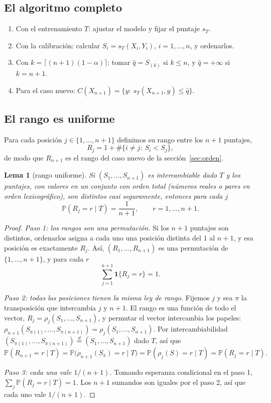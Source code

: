 \documentclass[11pt]{article}
\theoremstyle{plain}
\newtheorem{lema}[teorema]{Lema}
\theoremstyle{definition}
\theoremstyle{remark}
\newcommand{\Prob}{\mathbb P}
\newcommand{\ind}{\mathbf 1}
\newcommand{\qhat}{\widehat q}
\newcommand{\eqd}{\overset{d}{=}}
\begin{document}
\subsection{El algoritmo completo}
\begin{enumerate}
\item Con el entrenamiento $T$: ajustar el modelo y fijar el puntaje $s_T$.
\item Con la calibración: calcular $S_i=s_T(X_i,Y_i)$, $i=1,\dots,n$, y ordenarlos.
\item Con $k=\lceil(n+1)(1-\alpha)\rceil$: tomar $\qhat=S_{(k)}$ si $k\le n$, y $\qhat=+\infty$ si
$k=n+1$.
\item Para el caso nuevo: $C(X_{n+1})=\{y:\ s_T(X_{n+1},y)\le\qhat\}$.
\end{enumerate}

\subsection{El rango es uniforme}
Para cada posición $j\in\{1,\dots,n+1\}$ definimos su rango entre los $n+1$ puntajes,
\[
 R_j=1+\#\{i\ne j:\ S_i<S_j\},
\]
de modo que $R_{n+1}$ es el rango del caso nuevo de la sección~\ref{sec:orden}.
\begin{lema}[rango uniforme]\label{lem:rango}
Si $(S_1,\dots,S_{n+1})$ es intercambiable dado $T$ y los puntajes, con valores en un conjunto con
orden total (números reales o pares en orden lexicográfico), son distintos casi seguramente, entonces
para cada $j$
\[
 \Prob(R_j=r\mid T)=\frac1{n+1},\qquad r=1,\dots,n+1.
\]
\end{lema}
\begin{proof}
\emph{Paso 1: los rangos son una permutación.} Si los $n+1$ puntajes son distintos, ordenarlos asigna
a cada uno una posición distinta del $1$ al $n+1$, y esa posición es exactamente $R_j$. Así,
$(R_1,\dots,R_{n+1})$ es una permutación de $\{1,\dots,n+1\}$, y para cada $r$
\[
 \sum_{j=1}^{n+1}\ind\{R_j=r\}=1 .
\]

\emph{Paso 2: todas las posiciones tienen la misma ley de rango.} Fijemos $j$ y sea $\pi$ la
transposición que intercambia $j$ y $n+1$. El rango es una función de todo el vector,
$R_j=\rho_j(S_1,\dots,S_{n+1})$, y permutar el vector intercambia los papeles:
$\rho_{n+1}(S_{\pi(1)},\dots,S_{\pi(n+1)})=\rho_j(S_1,\dots,S_{n+1})$. Por intercambiabilidad
$(S_{\pi(1)},\dots,S_{\pi(n+1)})\eqd(S_1,\dots,S_{n+1})$ dado $T$, así que
\[
 \Prob(R_{n+1}=r\mid T)=\Prob\bigl(\rho_{n+1}(S_\pi)=r\mid T\bigr)=\Prob(\rho_j(S)=r\mid T)=\Prob(R_j=r\mid T).
\]

\emph{Paso 3: cada una vale $1/(n+1)$.} Tomando esperanza condicional en el paso 1,
$\sum_{j}\Prob(R_j=r\mid T)=1$. Los $n+1$ sumandos son iguales por el paso 2, así que cada uno vale
$1/(n+1)$.
\end{proof}
\end{document}
